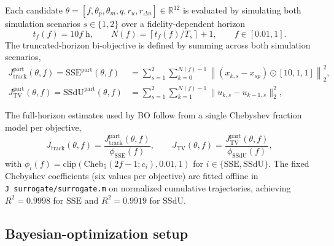 \documentclass[11pt,a4paper]{article}
\newcommand{\jtrack}{J_{\mathrm{track}}}
\newcommand{\jtv}{J_{\mathrm{TV}}}
\newcommand{\sse}{\mathrm{SSE}}
\newcommand{\ssdu}{\mathrm{SSdU}}
\newcommand{\Ts}{T_s}
\newcommand{\Cheb}[1]{\mathrm{Cheb}_5\!\left(#1\right)}
\begin{document}
Each candidate $\theta = [f, \theta_p, \theta_m, q, r_u, r_{\Delta u}] \in \mathbb{R}^{12}$ is evaluated by simulating both simulation scenarios $s \in \{1, 2\}$ over a fidelity-dependent horizon
\begin{equation}
t_f(f) = 10 f \;\mathrm{h}, \qquad N(f) = \left\lceil t_f(f)/\Ts \right\rceil + 1, \qquad f \in [0.01, 1].
\end{equation}
The truncated-horizon bi-objective is defined by summing across both simulation scenarios,
\begin{align}
\jtrack^{\mathrm{part}}(\theta, f) = \sse^{\mathrm{part}}(\theta, f) &= \sum_{s=1}^2 \sum_{k=0}^{N(f)-1} \left\| (x_{k,s} - x_{sp}) \odot [10, 1, 1]\right\|_2^2, \\
\jtv^{\mathrm{part}}(\theta, f) =  \ssdu^{\mathrm{part}}(\theta, f) &= \sum_{s=1}^2\sum_{k=1}^{N(f)-1} \|u_{k,s} - u_{k-1,s}\|_2^2,
\end{align}

The full-horizon estimates used by BO follow from a single Chebyshev fraction model per objective,
\begin{equation}
\jtrack(\theta, f) = \frac{\jtrack^{\mathrm{part}}(\theta, f)}{\phi_{\sse}(f)},
\qquad
\jtv(\theta, f) = \frac{\jtv^{\mathrm{part}}(\theta, f)}{\phi_{\ssdu}(f)},
\end{equation}
with $\phi_i(f) = \mathrm{clip}\!\left(\Cheb{2f-1; c_i}, 0.01, 1\right)$ for $i \in \{\sse, \ssdu\}$. The fixed Chebyshev coefficients (six values per objective) are fitted offline in \texttt{J~surrogate/surrogate.m} on normalized cumulative trajectories, achieving $R^2 = 0.9998$ for $\sse$ and $R^2 = 0.9919$ for $\ssdu$.

\subsection{Bayesian-optimization setup}
\end{document}

